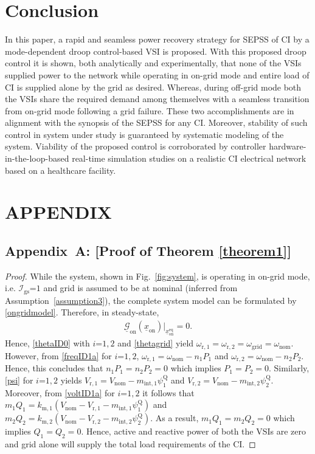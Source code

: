 \documentclass[journal]{IEEEtran}
\begin{document}
\section{Conclusion}\label{conclusion}
In this paper, a rapid and seamless power recovery strategy for SEPSS of CI by a mode-dependent droop control-based VSI is proposed. With this proposed droop control it is shown, both analytically and experimentally, that none of the VSIs supplied power to the network while operating in on-grid mode and entire load of CI is supplied alone by the grid as desired. Whereas, during off-grid mode both the VSIs share the required demand among themselves with a seamless transition from on-grid mode following a grid failure. These two accomplishments are in alignment with the synopsis of the SEPSS for any CI. Moreover, stability of such control in system under study is guaranteed by systematic modeling of the system. Viability of the proposed control is corroborated by controller hardware-in-the-loop-based real-time simulation studies on a realistic CI electrical network based on a healthcare facility.
\section*{APPENDIX}
\subsection*{Appendix~A: [Proof of Theorem \ref{theorem1}]}
\begin{proof}
While the system, shown in Fig.~\ref{fig:system}, is operating in on-grid mode, i.e. $\mathcal{I}_\mathrm{gs}$=$1$ and grid is assumed to be at nominal (inferred from Assumption~\ref{assumption3}), the complete system model can be formulated by \eqref{ongridmodel}. Therefore, in steady-state, 
\begin{align*}
    \underline{\mathcal{G}}_\mathrm{on}(\underline{x}_\mathrm{on})\Big|_{\underline{x}_\mathrm{on}^\mathrm{eq}}=0.
\end{align*}
Hence, \eqref{thetaID0} with $i$=$1,2$ and \eqref{thetagrid} yield $\omega_\mathrm{r,1}=\omega_\mathrm{r,2}=\omega_\mathrm{grid} = \omega_\mathrm{nom}$. However, from \eqref{freqID1a} for $i$=$1,2$, $\omega_\mathrm{r,1}=\omega_\mathrm{nom}-n_\mathrm{1}P_\mathrm{1}$ and $\omega_\mathrm{r,2}=\omega_\mathrm{nom}-n_\mathrm{2}P_\mathrm{2}$. Hence, this concludes that $n_\mathrm{1}P_\mathrm{1}=n_\mathrm{2}P_\mathrm{2}=0$ which implies $P_\mathrm{1}=P_\mathrm{2}=0$.\newline
Similarly, \eqref{psi} for $i$=$1,2$ yields $V_\mathrm{r,1}=V_\mathrm{nom}-m_\mathrm{int,1}\psi_\mathrm{1}^\mathrm{Q}$ and $V_\mathrm{r,2}=V_\mathrm{nom}-m_\mathrm{int,2}\psi_\mathrm{2}^\mathrm{Q}$. Moreover, from \eqref{voltID1a} for $i$=$1,2$ it follows that $m_\mathrm{1}Q_\mathrm{1}=k_\mathrm{m,1}(V_\mathrm{nom}-V_\mathrm{r,1}-m_\mathrm{int,1}\psi_\mathrm{1}^\mathrm{Q})$ and $m_\mathrm{2}Q_\mathrm{2}=k_\mathrm{m,2}(V_\mathrm{nom}-V_\mathrm{r,2}-m_\mathrm{int,2}\psi_\mathrm{2}^\mathrm{Q})$. As a result, $m_\mathrm{1}Q_\mathrm{1}=m_\mathrm{2}Q_\mathrm{2}=0$ which implies $Q_\mathrm{1}=Q_\mathrm{2}=0$. Hence, active and reactive power of both the VSIs are zero and grid alone will supply the total load requirements of the CI.
\end{proof}
\end{document}

